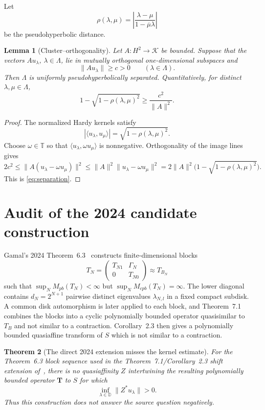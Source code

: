 \documentclass[11pt]{article}
\newtheorem{theorem}{Theorem}
\newtheorem{lemma}[theorem]{Lemma}
\newcommand{\D}{\mathbb D}
\newcommand{\Htwo}{H^2}
\newcommand{\K}{\mathcal K}
\newcommand{\rhoh}{\rho}
\begin{document}
Let
\[
 \rhoh(\lambda,\mu)=\left|\frac{\lambda-\mu}
 {1-\overline\mu\lambda}\right|
\]
be the pseudohyperbolic distance.

\begin{lemma}[Cluster--orthogonality]\label{lem:cluster}
Let $A:\Htwo\to\K$ be bounded.  Suppose that the vectors
$Au_\lambda$, $\lambda\in\Lambda$, lie in mutually orthogonal
one-dimensional subspaces and
\[
 \|Au_\lambda\|\geq c>0\qquad(\lambda\in\Lambda).
\]
Then $\Lambda$ is uniformly pseudohyperbolically separated.  Quantitatively,
for distinct $\lambda,\mu\in\Lambda$,
\begin{equation}\label{eq:separation}
 1-\sqrt{1-\rhoh(\lambda,\mu)^2}
 \geq \frac{c^2}{\|A\|^2}.
\end{equation}
\end{lemma}

\begin{proof}
The normalized Hardy kernels satisfy
\[
 |\langle u_\lambda,u_\mu\rangle|
 =\sqrt{1-\rhoh(\lambda,\mu)^2}.
\]
Choose $\omega\in\mathbb T$ so that
$\langle u_\lambda,\omega u_\mu\rangle$ is nonnegative.  Orthogonality of
the image lines gives
\[
 2c^2\leq\|A(u_\lambda-\omega u_\mu)\|^2
 \leq\|A\|^2\|u_\lambda-\omega u_\mu\|^2
 =2\|A\|^2\bigl(1-\sqrt{1-\rhoh(\lambda,\mu)^2}\bigr).
\]
This is \eqref{eq:separation}.
\end{proof}

\section{Audit of the 2024 candidate construction}\label{sec:audit}

Gamal's 2024 Theorem~6.3~\cite{Gamal2024} constructs finite-dimensional
blocks
\[
 T_N=\begin{pmatrix}T_{N1}&\Gamma_N\\0&T_{N0}\end{pmatrix}
 \approx T_{B_N}
\]
such that $\sup_N M_{pb}(T_N)<\infty$ but
$\sup_N M_{cpb}(T_N)=\infty$.  The lower diagonal contains
$d_N=2^{N+1}$ pairwise distinct eigenvalues
$\lambda_{N,l}$ in a fixed compact subdisk.  A common disk automorphism is
later applied to each block, and Theorem~7.1 combines the blocks into a
cyclic polynomially bounded operator quasisimilar to $T_B$ and not similar
to a contraction.  Corollary~2.3 then gives a polynomially bounded
quasiaffine transform of $S$ which is not similar to a contraction.

\begin{theorem}[The direct 2024 extension misses the kernel estimate]
\label{thm:audit}
For the Theorem~6.3 block sequence used in the Theorem~7.1/Corollary~2.3
shift extension of~\cite{Gamal2024}, there is no quasiaffinity
$Z$ intertwining the resulting polynomially bounded operator $\mathbf T$
to $S$ for which
\[
 \inf_{\lambda\in\D}\|Z^*u_\lambda\|>0.
\]
Thus this construction does not answer the source question negatively.
\end{theorem}
\end{document}
